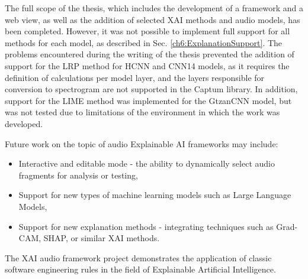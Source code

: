 \documentclass[
    bindingoffset=5mm,  %
    footnoteindent=3mm, %
    hyphenation=true    %
]{src/wut-thesis}
\begin{document}
The full scope of the thesis, which includes the development of a framework and a web view,
as well as the addition of selected XAI methods and audio models, has been completed.
However, it was not possible to implement full support for all methods for each model, 
as described in Sec. \ref{ch6:ExplanationSupport}.
The problems encountered during the writing of the thesis prevented the
addition of support for the LRP method for HCNN and CNN14 models, as it requires the definition
of calculations per model layer, and the layers responsible for conversion to spectrogram are
not supported in the Captum library. In addition, support for the LIME method was implemented for
the GtzanCNN model, but was not tested due to limitations of the environment in which the work was developed.

Future work on the topic of audio Explainable AI frameworks may include:
\begin{itemize}
    \item Interactive and editable mode - the ability to dynamically select audio fragments for 
          analysis or testing,
    \item Support for new types of machine learning models such as Large Language Models,
    \item Support for new explanation methods - integrating techniques such as Grad-CAM, SHAP,
        or similar XAI methods.
\end{itemize}

The XAI audio framework project demonstrates the application of classic software engineering rules
in the field of Explainable Artificial Intelligence.

\cleardoublepage %
\printbibliography
\clearpage

\acronymlist
{}
\vspace{0.8cm}
\end{document}
